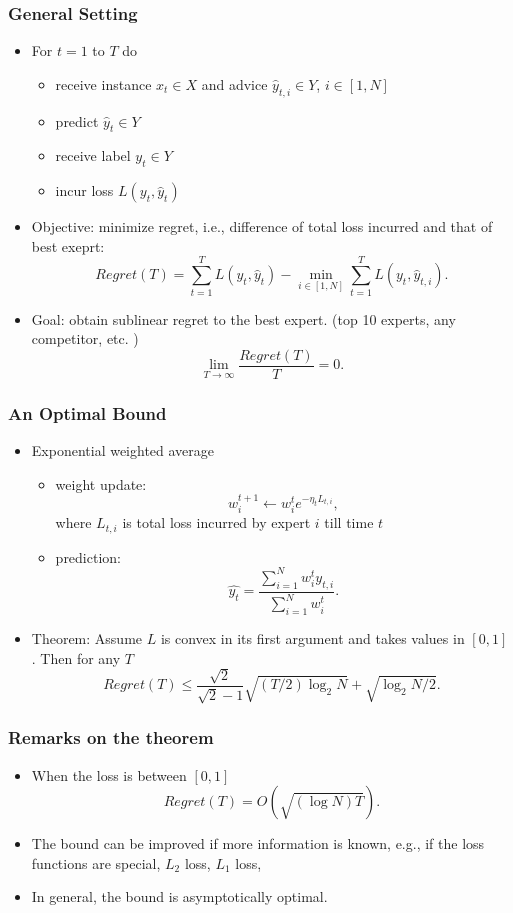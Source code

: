 \documentclass{beamer}
\begin{document}
\begin{frame}
\frametitle{General Setting}
\begin{itemize}
\item{For $t = 1$ to $T$ do}
	\begin{itemize}
	\item{receive instance $x_t\in X$ and advice $\hat{y}_{t,i}\in Y$, $i\in [1,N]$}
	\item{predict $\hat{y}_t\in Y$}
	\item{receive label $y_t\in Y$}
	\item{incur loss $L(y_t,\hat{y}_t)$}
	\end{itemize}
\item {\color{red}Objective:} minimize regret, i.e., difference of total loss incurred and that of best exeprt:
$$Regret(T) = \sum_{t=1}^TL(y_t,\hat{y}_t)-\min_{i\in[1,N]}\sum_{t=1}^TL(y_t,\hat{y}_{t,i}).$$
	
\item Goal: obtain {\color{red}sublinear regret} to the {\color{red}best expert}. (top 10 experts, any competitor, etc. )
$$\lim_{T\to \infty}\frac{Regret(T)}{T} = 0.$$
\end{itemize}


\end{frame}

\begin{frame}
\frametitle{An Optimal Bound}
\begin{itemize}
\item Exponential weighted average

\begin{itemize}
\item weight update:
$$w_i^{t+1} \leftarrow w_i^t e^{-\eta_t L_{t,i}},$$
where $L_{t,i}$ is total loss incurred by expert $i$ till time $t$
\item prediction:
$$\hat{y_t} = \frac{\sum_{i=1}^Nw_{i}^ty_{t,i}}{\sum_{i=1}^Nw_{i}^t}.$$ 
\end{itemize}
\item Theorem: Assume $L$ is convex in its first argument and takes values in $[0,1]$. Then for any $T$
$$Regret(T)\le \frac{\sqrt{2}}{\sqrt{2}-1}\sqrt{(T/2)\log_2 N}+\sqrt{\log_2 N/2}.$$


\end{itemize}


\end{frame}
\begin{frame}
\frametitle{Remarks on the theorem}
\begin{itemize}
\item When the loss is between $[0,1]$ 
$$Regret(T) = O(\sqrt{(\log N) T}).$$
\item The bound can be improved if more information is known, e.g., if the loss functions are special, $L_2$ loss, $L_1$ loss, 
\item In general, the bound is asymptotically optimal. 

\end{itemize}


\end{frame}
\end{document}
